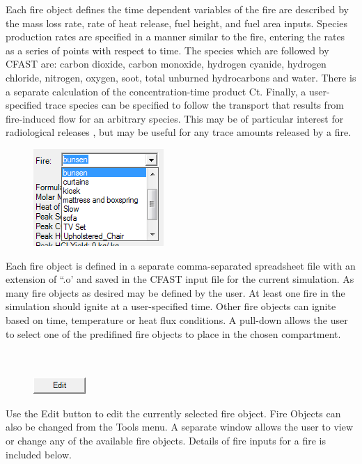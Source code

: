 Each fire object defines the time dependent variables of the fire are described by the mass loss rate, rate of heat release, fuel height, and fuel area inputs.  Species production rates are specified in a manner similar to the fire, entering the rates as a series of points with respect to time.  The species which are followed by CFAST are: carbon dioxide, carbon monoxide, hydrogen cyanide, hydrogen chloride, nitrogen, oxygen, soot, total unburned hydrocarbons and water. There is a separate calculation of the concentration-time product Ct. Finally, a user-specified trace species can be specified to follow the transport that results from fire-induced flow for an arbitrary species. This may be of particular interest for radiological releases \cite{Jones:2008}, but may be useful for any trace amounts released by a fire.

\begin{figure}
  \includegraphics[width=1.948in]{FIGURES/Input_File/Fire_Pulldown}
\end{figure}

Each fire object is defined in a separate comma-separated spreadsheet file with an extension of ``.o' and saved in the CFAST input file for the current simulation. As many fire objects as desired may be defined by the user.  At least one fire in the simulation should ignite at a user-specified time.  Other fire objects can ignite based on time, temperature or heat flux conditions. A pull-down allows the user to select one of the predifined fire objects to place in the chosen compartment. \\~ \\~ \\

\begin{figure}
  \includegraphics[width=0.781in]{FIGURES/Input_File/Edit_Button}
\end{figure}

Use the Edit button to edit the currently selected fire object. Fire Objects can also be changed from the Tools menu. A separate window allows the user to view or change any of the available fire objects. Details of fire inputs for a fire is included below.

